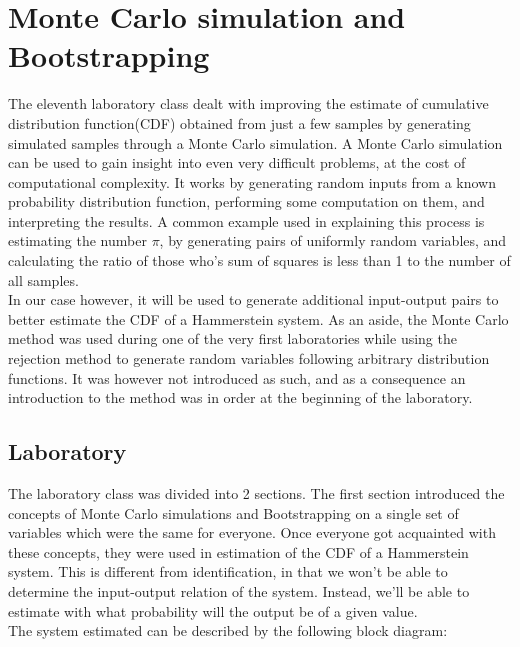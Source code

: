 \chapter{Monte Carlo simulation and Bootstrapping}

The eleventh laboratory class dealt with improving the estimate of cumulative distribution function(CDF) obtained
from just a few samples by generating simulated samples through a Monte Carlo simulation.
A Monte Carlo simulation can be used to gain insight into even very difficult problems, at the cost of computational complexity.
It works by generating random inputs from a known probability distribution function, performing some computation on them, and
interpreting the results. A common example used in explaining this process is estimating the number $\pi$, by generating pairs of
uniformly random variables, and calculating the ratio of those who's sum of squares is less than 1 to the number of all samples.\\
In our case however, it will be used to generate additional input-output pairs to better estimate the CDF of a Hammerstein system.
As an aside, the Monte Carlo method was used during one of the very first laboratories while using the rejection method to generate random variables following arbitrary distribution functions. It was however not introduced as such, and as a consequence an introduction to the method was in order at the beginning of the laboratory.

\section{Laboratory}
The laboratory class was divided into 2 sections. The first section introduced the concepts of Monte Carlo simulations and Bootstrapping on a single set
of variables which were the same for everyone. Once everyone got acquainted with these concepts, they were used in estimation of the CDF of a Hammerstein system.
This is different from identification, in that we won't be able to determine the input-output relation of the system. Instead, we'll be able to estimate with what probability will the output be of a given value.\\
The system estimated can be described by the following block diagram:
 
